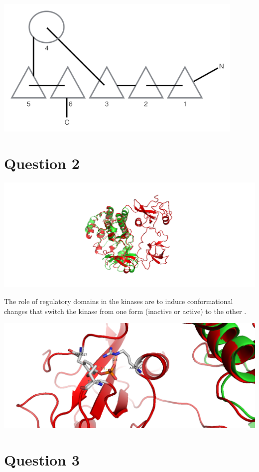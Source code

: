 \documentclass[11pt, a4paper,titlepage]{article}
\begin{document}
\includegraphics[width=12cm]{./Figures/1b.png}

\section{Question 2}
\includegraphics[width=15cm]{./Figures/2a.png}

The role of regulatory domains in the kinases are to induce
conformational changes that switch the kinase from one form (inactive
or active) to the other \cite{ConformationalPlasticityKinases}.

\includegraphics[width=15cm]{./Figures/2b.png}

\section{Question 3}
\end{document}

